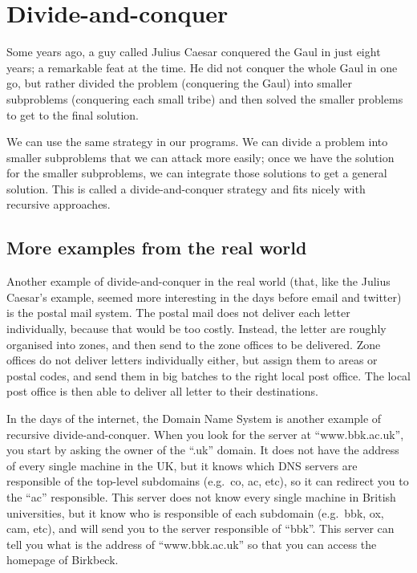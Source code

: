 
\section{Divide-and-conquer}
\label{sec:divide-conquer}

Some years ago, a guy called Julius Caesar conquered the Gaul in just
eight years; a remarkable feat at the time. He did not conquer the
whole Gaul in one go, but rather divided the problem (conquering the
Gaul) into smaller subproblems (conquering each small tribe) and then
solved the smaller problems to get to the final solution. 

We can use the same strategy in our programs. We can divide a problem
into smaller subproblems that we can attack more easily; once we have
the solution for the smaller subproblems, we can integrate those
solutions to get a general solution. This is called a
divide-and-conquer strategy and fits nicely with recursive
approaches. 

\subsection{More examples from the real world}
\label{sec:an-example-from}

Another example of divide-and-conquer in the real world (that, like
the Julius Caesar's example, seemed more interesting in the days before email
and twitter) is the postal mail system. The postal mail does not
deliver each letter individually, because that would be too
costly. Instead, the letter are roughly organised into zones, and then
send to the zone offices to be delivered. Zone offices do not deliver
letters individually either, but assign them to areas or postal codes,
and send them in big batches to the right local post office. The local
post office is then able to deliver all letter to their destinations. 

In the days of the internet, the Domain Name System is another example
of recursive divide-and-conquer. When you look for the server at
``www.bbk.ac.uk'', you start by asking the owner of the ``.uk''
domain. It does not have the address of every single machine in the
UK, but it knows which DNS servers are responsible of the top-level
subdomains (e.g.~co, ac, etc), so it can redirect you to the ``ac''
responsible. This server does not know every single machine in British
universities, but it know who is responsible of each subdomain
(e.g.~bbk, ox, cam, etc), and will send you to the server responsible
of ``bbk''. This server can tell you what is the address of
``www.bbk.ac.uk'' so that you can access the homepage of Birkbeck. 

